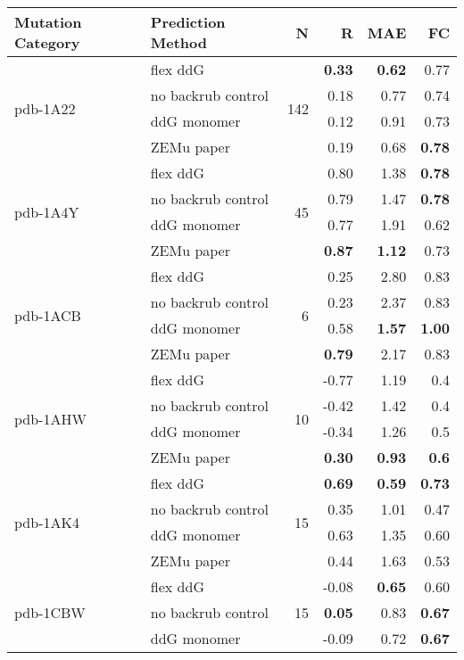 \begin{longtable}{llrrrr}
\toprule
Mutation Category &   Prediction Method &   N &     R &  MAE &   FC \\
\midrule
 \multirow{ 4}{*}{pdb-1A22} & flex ddG & \multirow{ 4}{*}{142} & \textbf{0.33} & \textbf{0.62} & 0.77  \\
 & no backrub control & & 0.18 & 0.77 & 0.74  \\
 & ddG monomer & & 0.12 & 0.91 & 0.73  \\
 & ZEMu paper & & 0.19 & 0.68 & \textbf{0.78}  \\
\hline
 \multirow{ 4}{*}{pdb-1A4Y} & flex ddG & \multirow{ 4}{*}{45} & 0.80 & 1.38 & \textbf{0.78}  \\
 & no backrub control & & 0.79 & 1.47 & \textbf{0.78}  \\
 & ddG monomer & & 0.77 & 1.91 & 0.62  \\
 & ZEMu paper & & \textbf{0.87} & \textbf{1.12} & 0.73  \\
\hline
 \multirow{ 4}{*}{pdb-1ACB} & flex ddG & \multirow{ 4}{*}{6} & 0.25 & 2.80 & 0.83  \\
 & no backrub control & & 0.23 & 2.37 & 0.83  \\
 & ddG monomer & & 0.58 & \textbf{1.57} & \textbf{1.00}  \\
 & ZEMu paper & & \textbf{0.79} & 2.17 & 0.83  \\
\hline
 \multirow{ 4}{*}{pdb-1AHW} & flex ddG & \multirow{ 4}{*}{10} & -0.77 & 1.19 & 0.4  \\
 & no backrub control & & -0.42 & 1.42 & 0.4  \\
 & ddG monomer & & -0.34 & 1.26 & 0.5  \\
 & ZEMu paper & & \textbf{0.30} & \textbf{0.93} & \textbf{0.6}  \\
\hline
 \multirow{ 4}{*}{pdb-1AK4} & flex ddG & \multirow{ 4}{*}{15} & \textbf{0.69} & \textbf{0.59} & \textbf{0.73}  \\
 & no backrub control & & 0.35 & 1.01 & 0.47  \\
 & ddG monomer & & 0.63 & 1.35 & 0.60  \\
 & ZEMu paper & & 0.44 & 1.63 & 0.53  \\
\hline
 \multirow{ 4}{*}{pdb-1CBW} & flex ddG & \multirow{ 4}{*}{15} & -0.08 & \textbf{0.65} & 0.60  \\
 & no backrub control & & \textbf{0.05} & 0.83 & \textbf{0.67}  \\
 & ddG monomer & & -0.09 & 0.72 & \textbf{0.67}  \\

\end{longtable}
